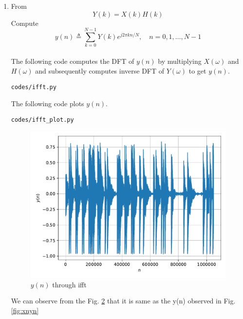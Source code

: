 \documentclass[journal,12pt,twocolumn]{IEEEtran}
\renewcommand\thesection{\arabic{section}}
\begin{document}
\begin{enumerate}[label=\thesection.\arabic*
,ref=\thesection.\theenumi]
\begin{figure}[!ht]
\caption{$X(k) and H(k)$}
\label{fig:xnhnfft}
\end{figure}
\item From
\begin{equation}
Y(k) = X(k)H(k)
\end{equation}
Compute
\begin{equation}
y(n) \triangleq \sum_{k=0}^{N-1} Y(k) e^{j 2 \pi k n / N}, \quad n=0,1, \ldots, N-1
\end{equation}
\\
\solution
The following code computes the DFT of $y(n)$ by multiplying $X(\omega)$ and $H(\omega)$ and subsequently computes inverse DFT of $Y(\omega)$ to get $y(n)$.
\begin{lstlisting}
codes/ifft.py
\end{lstlisting}
The following code plots $y(n)$.
\begin{lstlisting}
codes/ifft_plot.py
\end{lstlisting}
\begin{figure}[!ht]
\centering
\includegraphics[width=\columnwidth]{./figs/ifft}
\caption{$y(n)$ through ifft}
\label{fig:ynfft}
\end{figure}
We can observe from the Fig. \ref{fig:ynfft} that it is same as the y(n) observed in Fig.\ref{fig:xnyn}
\end{enumerate}
\end{document}
